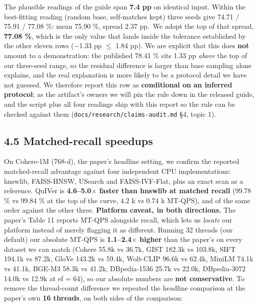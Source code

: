 \documentclass[
  10pt,
]{article}
\begin{document}
The plausible readings of the guide span \textbf{7.4 pp} on identical
input. Within the best-fitting reading (random base, self-matches kept)
three seeds give 74.71 / 75.91 / 77.08 \%: mean 75.90 \%, spread 2.37
pp.~We adopt the top of that spread, \textbf{77.08 \%}, which is the
only value that lands inside the tolerance established by the other
eleven rows ($-$1.33 pp $\leq$ 1.84 pp). We are explicit that this does
\textbf{not} amount to a demonstration: the published 78.41 \% sits 1.33
pp \emph{above} the top of our three-seed range, so the residual
difference is larger than base sampling alone explains, and the real
explanation is more likely to be a protocol detail we have not guessed.
We therefore report this row as \textbf{conditional on an inferred
protocol}; as the artifact's owners we will pin the rule down in the
released guide, and the script plus all four readings ship with this
report so the rule can be checked against them
(\texttt{docs/research/claims-audit.md} §4, topic 1).

\subsection{4.5 Matched-recall speedups}\label{matched-recall-speedups}

On Cohere-1M (768-d), the paper's headline setting, we confirm the
reported matched-recall advantage against four independent CPU
implementations: hnswlib, FAISS-HNSW, USearch and FAISS-IVF-Flat, plus
an exact scan as a reference. QuIVer is \textbf{4.6--5.0$\times$ faster than
hnswlib at matched recall} (99.78 \% vs 99.84 \% at the top of the
curve, 4.2 k vs 0.74 k MT-QPS), and of the same order against the other
three. \textbf{Platform caveat, in both directions.} The paper's Table
11 reports MT-QPS alongside recall, which lets us \emph{locate} our
platform instead of merely flagging it as different. Running 32 threads
(our default) our absolute MT-QPS is \textbf{1.1--2.4$\times$ higher} than the
paper's on every dataset we can match (Cohere 55.8k vs 36.7k, GIST
182.3k vs 103.8k, SIFT 194.1k vs 87.2k, GloVe 143.2k vs 59.4k, Wolt-CLIP
96.6k vs 62.4k, MiniLM 74.1k vs 41.1k, BGE-M3 58.3k vs 41.2k,
DBpedia-1536 25.7k vs 22.0k, DBpedia-3072 14.0k vs 12.9k at ef = 64), so
our absolute numbers are \textbf{not conservative}. To remove the
thread-count difference we repeated the headline comparison at the
paper's own \textbf{16 threads}, on both sides of the comparison:
\end{document}
